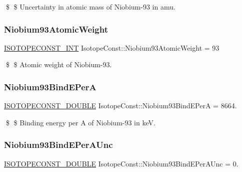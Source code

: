 \$ \$ Uncertainty in atomic mass of Niobium-\/93 in amu. \mbox{\label{group___isotope_const-_niobium-_nb93_gafb7d0656a4ebced3c2ceb92d128e170e}} 
\subsubsection{\texorpdfstring{Niobium93\+Atomic\+Weight}{Niobium93AtomicWeight}}
{\footnotesize\ttfamily \mbox{\hyperlink{group___isotope_const-_macros_ga5f18360b3e99483a35c32d789e62621c}{I\+S\+O\+T\+O\+P\+E\+C\+O\+N\+S\+T\+\_\+\+I\+NT}} Isotope\+Const\+::\+Niobium93\+Atomic\+Weight = 93}

\$ \$ Atomic weight of Niobium-\/93. \mbox{\label{group___isotope_const-_niobium-_nb93_gad0ad5d175ea5d1cad01f4d64939295f6}} 
\subsubsection{\texorpdfstring{Niobium93\+Bind\+E\+PerA}{Niobium93BindEPerA}}
{\footnotesize\ttfamily \mbox{\hyperlink{group___isotope_const-_macros_ga8f45a7272ce02c0b4c65c44636ed719a}{I\+S\+O\+T\+O\+P\+E\+C\+O\+N\+S\+T\+\_\+\+D\+O\+U\+B\+LE}} Isotope\+Const\+::\+Niobium93\+Bind\+E\+PerA = 8664.}

\$ \$ Binding energy per A of Niobium-\/93 in keV. \mbox{\label{group___isotope_const-_niobium-_nb93_ga03f85b4c96f301b66e0f87081ff2a06b}} 
\subsubsection{\texorpdfstring{Niobium93\+Bind\+E\+Per\+A\+Unc}{Niobium93BindEPerAUnc}}
{\footnotesize\ttfamily \mbox{\hyperlink{group___isotope_const-_macros_ga8f45a7272ce02c0b4c65c44636ed719a}{I\+S\+O\+T\+O\+P\+E\+C\+O\+N\+S\+T\+\_\+\+D\+O\+U\+B\+LE}} Isotope\+Const\+::\+Niobium93\+Bind\+E\+Per\+A\+Unc = 0.}

